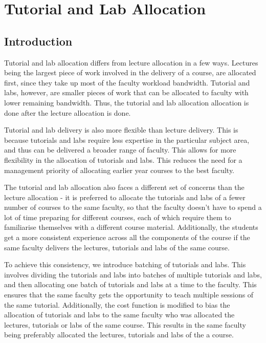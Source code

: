 \chapter{Tutorial and Lab Allocation}

\section{Introduction}

Tutorial and lab allocation differs from lecture allocation in a few ways. Lectures being the largest piece of work involved in the delivery of a course, are allocated first, since they take up most of the faculty workload bandwidth. Tutorial and labs, however, are smaller pieces of work that can be allocated to faculty with lower remaining bandwidth. Thus, the tutorial and lab allocation allocation is done after the lecture allocation is done.

Tutorial and lab delivery is also more flexible than lecture delivery. This is because tutorials and labs require less expertise in the particular subject area, and thus can be delivered a broader range of faculty. This allows for more flexibility in the allocation of tutorials and labs. This reduces the need for a management priority of allocating earlier year courses to the best faculty.

The tutorial and lab allocation also faces a different set of concerns than the lecture allocation - it is preferred to allocate the tutorials and labs of a fewer number of courses to the same faculty, so that the faculty doesn't have to spend a lot of time preparing for different courses, each of which require them to familiarise themselves with a different course material. Additionally, the students get a more consistent experience across all the components of the course if the same faculty delivers the lectures, tutorials and labs of the same course.

To achieve this consistency, we introduce batching of tutorials and labs. This involves dividing the tutorials and labs into batches of multiple tutorials and labs, and then allocating one batch of tutorials and labs at a time to the faculty. This ensures that the same faculty gets the opportunity to teach multiple sessions of the same tutorial. Additionally, the cost function is modified to bias the allocation of tutorials and labs to the same faculty who was allocated the lectures, tutorials or labs of the same course. This results in the same faculty being preferably allocated the lectures, tutorials and labs of the a course.

